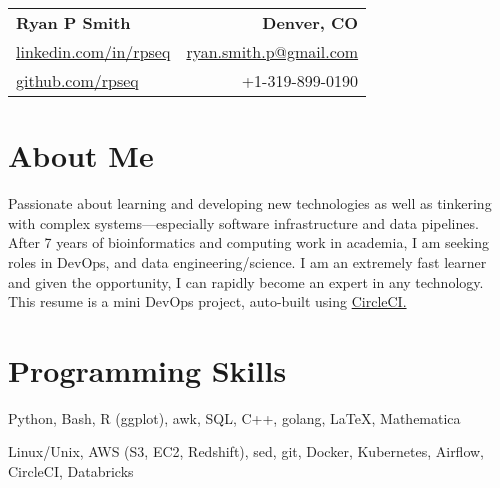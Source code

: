 
\RequirePackage{preamble}



\begin{tabular*}{\textwidth}{l@{\extracolsep{\fill}}r}
    \textbf{{\Large Ryan P Smith}} & \textbf{Denver, CO} \\
    \href{http://www.linkedin.com/in/rpseq}{linkedin.com/in/rpseq} &
    \href{mailto:ryan.smith.p@gmail.com}{ryan.smith.p@gmail.com} \\
    \href{https://github.com/RPSeq}{github.com/rpseq} & +1-319-899-0190 \\
\end{tabular*}

\section{About Me}
      
   \small{Passionate about learning and developing new technologies as well as tinkering with complex systems---especially software infrastructure and data pipelines. After 7 years of bioinformatics and computing work in academia, I am seeking roles in DevOps, and data engineering/science. I am an extremely fast learner and given the opportunity, I can rapidly become an expert in any technology. This resume is a mini DevOps project, auto-built using \href{https://circleci.com/gh/RPSeq/resume}{CircleCI.}}

    
\section{Programming Skills}
    \resumeSubHeadingListStart

        {Python, Bash, R (ggplot), awk, SQL, C++, golang, \LaTeX, Mathematica}
          
        {Linux/Unix, AWS (S3, EC2, Redshift), sed, git, Docker, Kubernetes, Airflow, CircleCI, Databricks}
          
    \resumeSubHeadingListEnd

